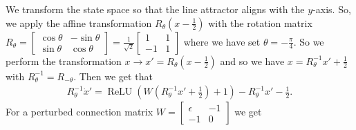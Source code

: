 \documentclass{article} %
\newcounter{ct}
\theoremstyle{definition}
\theoremstyle{remark}
\begin{document}
We transform the state space so that the line attractor aligns with the $y$-axis.
So, we apply the affine transformation $R_\theta(x-\frac{1}{2})$ with the rotation matrix $R_\theta = \begin{bmatrix}\cos\theta &-\sin\theta\\\sin\theta&\cos\theta\end{bmatrix}= \frac{1}{\sqrt{2}}\begin{bmatrix}1 &1\\-1&1\end{bmatrix}$ where we have set $\theta=-\frac{\pi}{4}$.
So we perform the transformation $x\rightarrow x'= R_\theta(x-\frac{1}{2})$ and so we have $x=R^{-1}_\theta x'+\frac{1}{2}$ with $R^{-1}_\theta = R_{-\theta}$.
Then we get that 
\begin{align}
R_{\theta}^{-1}\dot x' = \operatorname{ReLU}\left(W(R^{-1}_\theta x'+\frac{1}{2})+1\right)-R^{-1}_\theta x'-\frac{1}{2}.
\end{align}
For a perturbed connection matrix $W=\begin{bmatrix}\epsilon &-1\\-1&0\end{bmatrix}$ we get 
\end{document}
